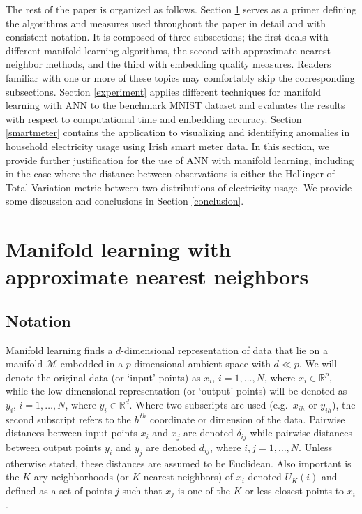 \documentclass[11pt,a4paper,]{article}
\begin{document}
The rest of the paper is organized as follows.
Section \ref{mlann} serves as a primer defining the algorithms and measures used throughout the paper in detail and with consistent notation. It is composed of three subsections; the first deals with different manifold learning algorithms, the second with approximate nearest neighbor methods, and the third with embedding quality measures. Readers familiar with one or more of these topics may comfortably skip the corresponding subsections. Section \ref{experiment} applies different techniques for manifold learning with ANN to the benchmark MNIST dataset and evaluates the results with respect to computational time and embedding accuracy. Section \ref{smartmeter} contains the application to visualizing and identifying anomalies in household electricity usage using Irish smart meter data. In this section, we provide further justification for the use of ANN with manifold learning, including in the case where the distance between observations is either the Hellinger of Total Variation metric between two distributions of electricity usage. We provide some discussion and conclusions in Section \ref{conclusion}.

\hypertarget{mlann}{%
\section{Manifold learning with approximate nearest neighbors}\label{mlann}}

\hypertarget{notation}{%
\subsection{Notation}\label{notation}}

Manifold learning finds a \(d\)-dimensional representation of data that lie on a manifold \(\mathcal{M}\) embedded in a \(p\)-dimensional ambient space with \(d \ll p\). We will denote the original data (or `input' points) as \(x_i\), \(i=1,\dots,N\), where \(x_i\in\mathbb{R}^p\), while the low-dimensional representation (or `output' points) will be denoted as \(y_i\), \(i=1,\dots,N\), where \(y_i\in\mathbb{R}^d\). Where two subscripts are used (e.g.~\(x_{ih}\) or \(y_{ih}\)), the second subscript refers to the \(h^{th}\) coordinate or dimension of the data. Pairwise distances between input points \(x_i\) and \(x_j\) are denoted \(\delta_{ij}\) while pairwise distances between output points \(y_i\) and \(y_j\) are denoted \(d_{ij}\), where \(i,j=1,\dots,N\). Unless otherwise stated, these distances are assumed to be Euclidean. Also important is the \(K\)-ary neighborhoods (or \(K\) nearest neighbors) of \(x_i\) denoted \(U_K(i)\) and defined as a set of points \(j\) such that \(x_j\) is one of the \(K\) or less closest points to \(x_i\).
\end{document}
